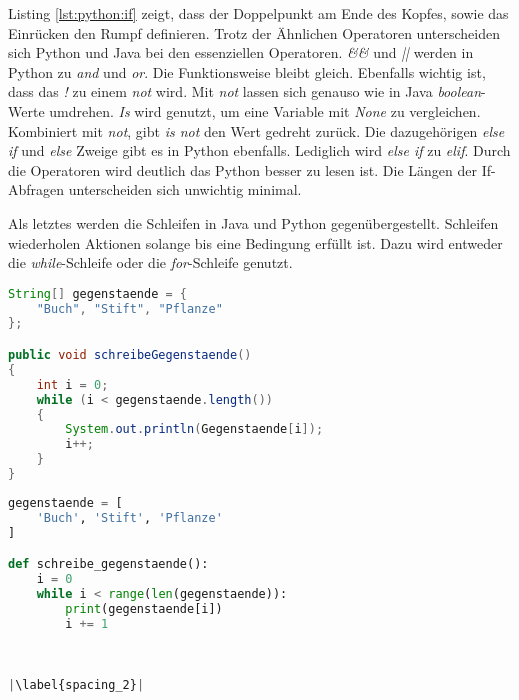 Listing \ref{lst:python:if} zeigt, dass der Doppelpunkt am Ende des Kopfes, sowie das Einrücken den Rumpf definieren.
Trotz der Ähnlichen Operatoren unterscheiden sich Python und Java bei den essenziellen Operatoren. \textit{\&\&} und \textit{||} werden in Python zu \textit{and} und \textit{or}. Die Funktionsweise bleibt gleich. Ebenfalls wichtig ist, dass das \textit{!} zu einem \textit{not} wird. Mit \textit{not} lassen sich genauso wie in Java \textit{boolean}-Werte umdrehen. \textit{Is} wird genutzt, um eine Variable mit \textit{None} zu vergleichen. Kombiniert mit \textit{not}, gibt \textit{is not} den Wert gedreht zurück. \cite{Python3:Buch}\cite{Louis:2010}
Die dazugehörigen \textit{else if} und \textit{else} Zweige gibt es in Python ebenfalls. Lediglich wird \textit{else if} zu \textit{elif}. Durch die Operatoren wird deutlich das Python besser zu lesen ist. Die Längen der If-Abfragen unterscheiden sich unwichtig minimal.\par
Als letztes werden die Schleifen in Java und Python gegenübergestellt. Schleifen wiederholen Aktionen solange bis eine Bedingung erfüllt ist. Dazu wird entweder die \textit{while}-Schleife oder die \textit{for}-Schleife genutzt.

\begin{minipage}{.5\linewidth}
\begin{lstlisting}[language=java,caption={while-Schleife Java},captionpos=b,label={lst:java:while},frame=none]
String[] gegenstaende = {
    "Buch", "Stift", "Pflanze"
};

public void schreibeGegenstaende()
{
    int i = 0;
    while (i < gegenstaende.length())
    {
        System.out.println(Gegenstaende[i]);
        i++;
    }
}
\end{lstlisting}
\end{minipage}
\begin{minipage}{.5\linewidth}
\begin{lstlisting}[language=python,caption={while-Schleife Python},captionpos=b,label={lst:python:while},frame=l,escapechar=|]
gegenstaende = [
    'Buch', 'Stift', 'Pflanze'
]

def schreibe_gegenstaende():
    i = 0
    while i < range(len(gegenstaende)):
        print(gegenstaende[i])
        i += 1
        
        

|\label{spacing_2}|
\end{lstlisting}
\end{minipage}

